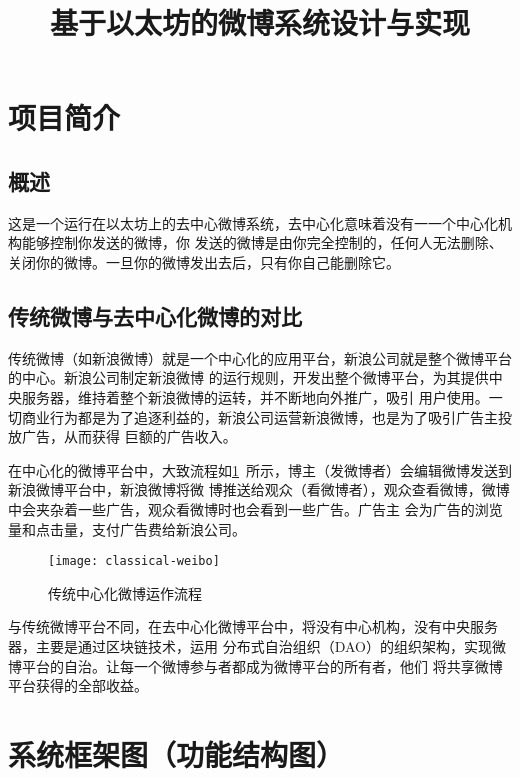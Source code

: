 \documentclass[bwprint]{hfutreport}
\title{基于以太坊的微博系统设计与实现}
\begin{document}
\maketitle

\pagestyle{plain}
\tableofcontents
\newpage
\pagestyle{plain}

\setcounter{page}{1}

\section{项目简介}
\subsection{概述}
这是一个运行在以太坊上的去中心微博系统，去中心化意味着没有一一个中心化机构能够控制你发送的微博，你
发送的微博是由你完全控制的，任何人无法删除、关闭你的微博。一旦你的微博发出去后，只有你自己能删除它。

\subsection{传统微博与去中心化微博的对比}
传统微博（如新浪微博）就是一个中心化的应用平台，新浪公司就是整个微博平台的中心。新浪公司制定新浪微博
的运行规则，开发出整个微博平台，为其提供中央服务器，维持着整个新浪微博的运转，并不断地向外推广，吸引
用户使用。一切商业行为都是为了追逐利益的，新浪公司运营新浪微博，也是为了吸引广告主投放广告，从而获得
巨额的广告收入。

在中心化的微博平台中，大致流程如\cref{fig:classical-weibo}~所示，博主（发微博者）会编辑微博发送到新浪微博平台中，新浪微博将微
博推送给观众（看微博者），观众查看微博，微博中会夹杂着一些广告，观众看微博时也会看到一些广告。广告主
会为广告的浏览量和点击量，支付广告费给新浪公司。

\begin{figure}[!htbp]
    \texttt{[image: classical-weibo]}
    \caption{传统中心化微博运作流程}
    \label{fig:classical-weibo}
\end{figure}

与传统微博平台不同，在去中心化微博平台中，将没有中心机构，没有中央服务器，主要是通过区块链技术，运用
分布式自治组织（DAO）的组织架构，实现微博平台的自治。让每一个微博参与者都成为微博平台的所有者，他们
将共享微博平台获得的全部收益。

\section{系统框架图（功能结构图）}
\end{document}
